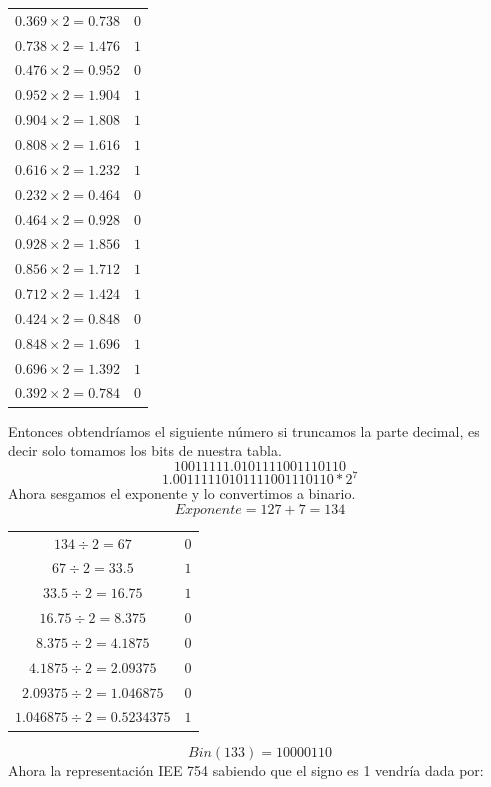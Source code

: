 \documentclass[12pt]{article}
\begin{document}
\begin{center}
    \begin{tabular}{|c|c|}
        \hline
        $0.369 \times 2 = 0.738$ & $0$\\
        $0.738 \times 2 = 1.476$ & $1$\\
        $0.476 \times 2 = 0.952$ & $0$\\
        $0.952 \times 2 = 1.904$ & $1$\\
        $0.904 \times 2 = 1.808$ & $1$\\
        $0.808 \times 2 = 1.616$ & $1$\\
        $0.616 \times 2 = 1.232$ & $1$\\
        $0.232 \times 2 = 0.464$ & $0$\\
        $0.464 \times 2 = 0.928$ & $0$\\
        $0.928 \times 2 = 1.856$ & $1$\\
        $0.856\times 2 = 1.712$ & $1$\\
        $0.712 \times 2 = 1.424$ & $1$\\
        $0.424\times 2 = 0.848$ & $0$\\
        $0.848 \times 2 = 1.696$ & $1$\\
        $0.696 \times 2 = 1.392$ & $1$\\
        $0.392 \times 2 = 0.784$ & $0$\\
        \hline
      \end{tabular} 
\end{center}

Entonces obtendríamos el siguiente número si truncamos la parte decimal, es decir solo tomamos los bits de nuestra tabla.
$$10011111.0101111001110110$$
$$1.00111110101111001110110*2^7$$
Ahora sesgamos el exponente y lo convertimos a binario.
$$Exponente= 127+7=134$$
\begin{center}
    \begin{tabular}{|c|c|}
        \hline
        $134 \div 2 = 67$ & $0$\\
        $67 \div 2 = 33.5$ & $1$\\
        $33.5 \div 2 = 16.75$ & $1$\\
        $16.75 \div 2 = 8.375$ & $0$\\
        $8.375 \div 2 = 4.1875$ & $0$\\
        $4.1875 \div 2 = 2.09375$ & $0$\\
        $2.09375 \div 2 = 1.046875$ & $0$\\
        $1.046875 \div 2 = 0.5234375$ & $1$\\
        \hline
      \end{tabular} 
\end{center}
$$Bin(133) = 10000110$$
Ahora la representación IEE 754 sabiendo que el signo es 1 vendría dada por:
\end{document}
